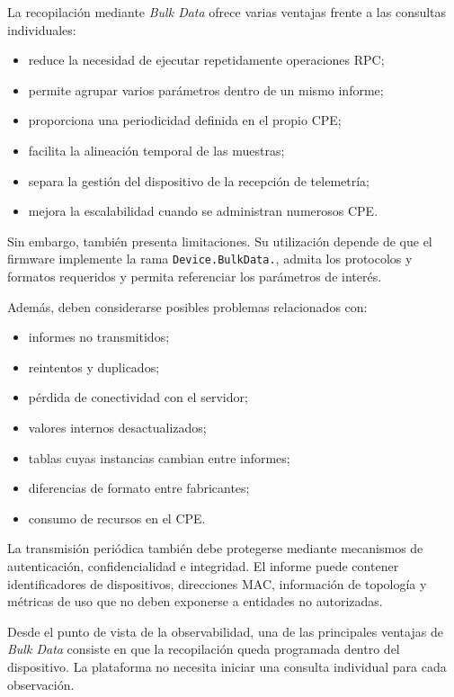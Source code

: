 La recopilación mediante \textit{Bulk Data} ofrece varias ventajas frente
a las consultas individuales:

\begin{itemize}
    \item reduce la necesidad de ejecutar repetidamente operaciones RPC;
    \item permite agrupar varios parámetros dentro de un mismo informe;
    \item proporciona una periodicidad definida en el propio CPE;
    \item facilita la alineación temporal de las muestras;
    \item separa la gestión del dispositivo de la recepción de
    telemetría;
    \item mejora la escalabilidad cuando se administran numerosos CPE.
\end{itemize}

Sin embargo, también presenta limitaciones. Su utilización depende de que
el firmware implemente la rama \texttt{Device.BulkData.}, admita los
protocolos y formatos requeridos y permita referenciar los parámetros de
interés.

Además, deben considerarse posibles problemas relacionados con:

\begin{itemize}
    \item informes no transmitidos;
    \item reintentos y duplicados;
    \item pérdida de conectividad con el servidor;
    \item valores internos desactualizados;
    \item tablas cuyas instancias cambian entre informes;
    \item diferencias de formato entre fabricantes;
    \item consumo de recursos en el CPE.
\end{itemize}

La transmisión periódica también debe protegerse mediante mecanismos de
autenticación, confidencialidad e integridad. El informe puede contener
identificadores de dispositivos, direcciones MAC, información de
topología y métricas de uso que no deben exponerse a entidades no
autorizadas.

Desde el punto de vista de la observabilidad, una de las principales
ventajas de \textit{Bulk Data} consiste en que la recopilación queda
programada dentro del dispositivo. La plataforma no necesita iniciar una
consulta individual para cada observación.

